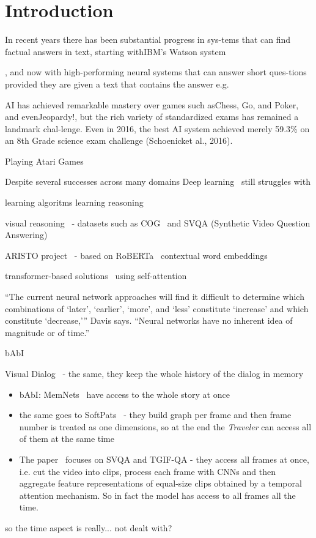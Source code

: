 \section{Introduction}

In recent years there has been substantial progress in sys-tems  that  can  find  factual  answers  in  text,  starting  withIBM’s Watson system~\cite{ferrucci2010building}

, and now with high-performing neural systems that can answer short ques-tions provided they are given a text that contains the answer e.g.~\cite{wang2018glue}


AI  has  achieved  remarkable  mastery  over  games  such  asChess, Go, and Poker, and evenJeopardy!, but the rich variety of standardized exams has remained a landmark chal-lenge.   Even  in  2016,  the  best  AI  system  achieved  merely 59.3\% on an 8th Grade science exam challenge (Schoenicket al., 2016).




Playing Atari Games~\cite{mnih2015human}


Despite several successes across many domains Deep learning~\cite{lecun2015deep} still struggles with

learning algoritms
learning reasoning~\cite{graves2016hybrid}


\cite{levesque2012winograd}

visual reasoning~\cite{mogadala2019trends} - datasets such as COG~\cite{yang2018dataset} and 
SVQA (Synthetic Video Question Answering)~\cite{song2018explore}


ARISTO project~\cite{clark2019f} - based on RoBERTa~\cite{liu2019roberta} contextual word embeddings

transformer-based solutions~\cite{vaswani2017attention} using self-attention


“The current neural network approaches will find it difficult to determine which combinations of ‘later’, ‘earlier’, ‘more’, and ‘less’ constitute ‘increase’ and which constitute ‘decrease,'” Davis says. “Neural networks have no inherent idea of magnitude or of time.”
~\cite{davis2016write}

bAbI~\cite{weston2015towards}

Visual Dialog~\cite{das2017visual} - the same, they keep the whole history of the dialog in memory

\begin{itemize}
\item bAbI:  MemNets~\cite{weston2014memory} have access to the whole story at once
\item the same goes to SoftPats~\cite{haurilet2019s} - they build graph per frame and then frame number is treated as one dimensions, so at the end the \textit{Traveler} can access all of them at the same time 
\item The paper~\cite{le2019learning} focuses on SVQA and TGIF-QA -  they access all frames at once, i.e. cut the video into clips, process each frame with CNNs and then aggregate feature representations of equal-size clips obtained by a temporal attention mechanism. So in fact the model has access to all frames all the time.
\end{itemize}
so the time aspect is really... not dealt with?

